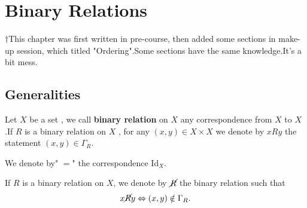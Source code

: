 \documentclass{book}
\numberwithin{equation}{section}
\begin{document}
\chapter{Binary Relations }
$\dagger$This chapter was first written in pre-course,  then added some sections in make-up session, which titled "Ordering".Some sections have the same knowledge.It's a bit mess.
\section{Generalities}
\begin{definitionenv}
    Let $X$ be a set , we call \textbf{binary relation} on $X$ any correspondence from $X$ to $X$ .If $R$ is a binary relation on $X$ , for any $(x, y)\in X\times X $ we denote by $x R y $ the statement $(x, y)\in \Gamma_R$.
\end{definitionenv}
\begin{exampleenv}
    We denote by" $=$" the correspondence $\mathrm{Id}_X$.
\end{exampleenv}
\begin{definitionenv}
    If $R$ is a binary relation on $X$,  we denote by $\cancel{R} $ the binary relation such that $$x \cancel{R}  y \Leftrightarrow (x, y)\notin \Gamma_R.$$
\end{definitionenv}
\end{document}
